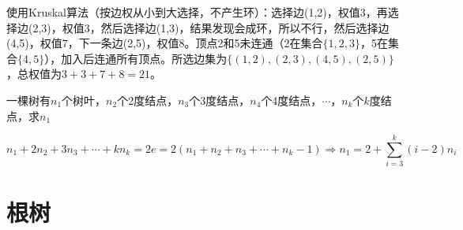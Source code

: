 使用Kruskal算法（按边权从小到大选择，不产生环）：选择边(1,2)，权值3，再选择边(2,3)，权值3，然后选择边(1,3)，结果发现会成环，所以不行，然后选择边(4,5)，权值7，下一条边(2,5)，权值8。顶点2和5未连通（2在集合$\{1,2,3\}$，5在集合$\{4,5\}$），加入后连通所有顶点。所选边集为$\{(1,2),(2,3),(4,5),(2,5)\}$，总权值为$3+3+7+8=21$。
\begin{example}{}{}
    一棵树有$n_1$个树叶，$n_2$个2度结点，$n_3$个3度结点，$n_4$个4度结点，$\cdots$，$n_k$个$k$度结点，求$n_1$
\end{example}
\vspace{-20pt}\[n_1+2n_2+3n_3+\cdots+kn_k=2e=2(n_1+n_2+n_3+\cdots+n_k-1)\Rightarrow n_1 = 2 + \sum_{i=3}^k (i-2)n_i\]
\section{根树}
